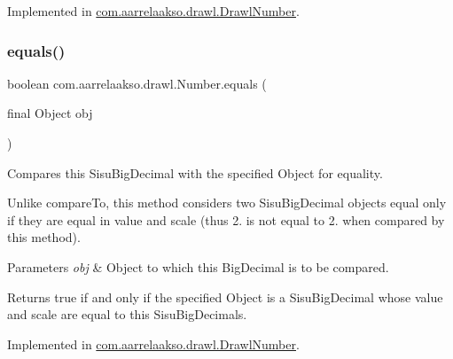 Implemented in \hyperlink{classcom_1_1aarrelaakso_1_1drawl_1_1_drawl_number_a09dfa96894d84cc9734e41bf4a88ae3b}{com.\+aarrelaakso.\+drawl.\+Drawl\+Number}.

\mbox{\label{interfacecom_1_1aarrelaakso_1_1drawl_1_1_number_a9cf883b0a5979a9f0420cca2c2ff9d89}} 
\subsubsection{\texorpdfstring{equals()}{equals()}\hspace{0.1cm}{\footnotesize\ttfamily [3/3]}}
{\footnotesize\ttfamily boolean com.\+aarrelaakso.\+drawl.\+Number.\+equals (\begin{DoxyParamCaption}\item[{final Object}]{obj }\end{DoxyParamCaption})}



Compares this Sisu\+Big\+Decimal with the specified Object for equality. 

Unlike compare\+To, this method considers two Sisu\+Big\+Decimal objects equal only if they are equal in value and scale (thus 2. is not equal to 2. when compared by this method).


\begin{DoxyParams}{Parameters}
{\em obj} & Object to which this Big\+Decimal is to be compared. \\
\hline
\end{DoxyParams}
\begin{DoxyReturn}{Returns}
true if and only if the specified Object is a Sisu\+Big\+Decimal whose value and scale are equal to this Sisu\+Big\+Decimal\textquotesingle{}s. 
\end{DoxyReturn}


Implemented in \hyperlink{classcom_1_1aarrelaakso_1_1drawl_1_1_drawl_number_a54d65831347b02b14569ddfc021a4ade}{com.\+aarrelaakso.\+drawl.\+Drawl\+Number}.

\mbox{\label{interfacecom_1_1aarrelaakso_1_1drawl_1_1_number_ad6df5caf5478cc3f85cc808cf39a0610}} 
